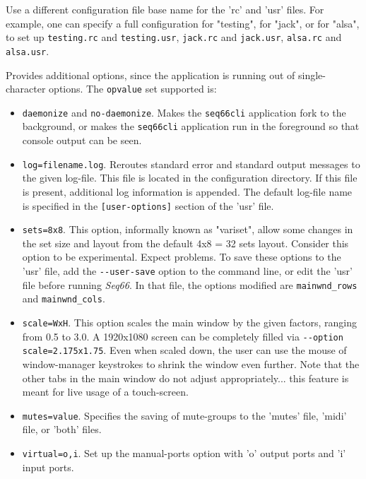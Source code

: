      Use a different configuration file base name for the 'rc' and 'usr'
      files.  For example, one can specify a full configuration for "testing",
      for "jack", or for "alsa", to set up
      \texttt{testing.rc} and \texttt{testing.usr},
      \texttt{jack.rc} and \texttt{jack.usr},
      \texttt{alsa.rc} and \texttt{alsa.usr}.

      Provides additional options, since the application is running out of
      single-character options.  The \texttt{opvalue} set supported is:
      \begin{itemize}
         \item \texttt{daemonize} and \texttt{no-daemonize}.
            Makes the \texttt{seq66cli} application fork to the background, or
            makes the \texttt{seq66cli} application
            run in the foreground so that console output can be seen.
         \item \texttt{log=filename.log}.
            Reroutes standard error and standard
            output messages to the given log-file.  This file is located in
            the configuration directory.
            If this file is present, additional log information is appended.
            The default log-file name is specified in the
            \texttt{[user-options]} section of the 'usr' file.
         \item \texttt{sets=8x8}.
            This option, informally known as "variset", allow some changes in
            the set size and layout from the default 4x8 = 32 sets layout.
            Consider this option to be experimental. Expect problems.
            To save these options to the 'usr' file, add the
            \texttt{-{}-user-save} option to the command line, or edit the
            'usr' file before running \textsl{Seq66}.
            In that file, the options modified are \texttt{mainwnd\_rows} and
            \texttt{mainwnd\_cols}.
         \item \texttt{scale=WxH}.
            This option scales the main window by the given factors,
            ranging from 0.5 to 3.0. A 1920x1080 screen can be completely
            filled via \texttt{-{}-option scale=2.175x1.75}. Even when scaled 
            down, the user can use the mouse of window-manager keystrokes to
            shrink the window even further.
            Note that the other tabs in the main window do not adjust
            appropriately... this feature is meant for live usage of
            a touch-screen.
         \item \texttt{mutes=value}. Specifies the saving of mute-groups
            to the 'mutes' file, 'midi' file, or 'both' files.
         \item \texttt{virtual=o,i}. Set up the manual-ports option with 'o'
            output ports and 'i' input ports.
      \end{itemize}

